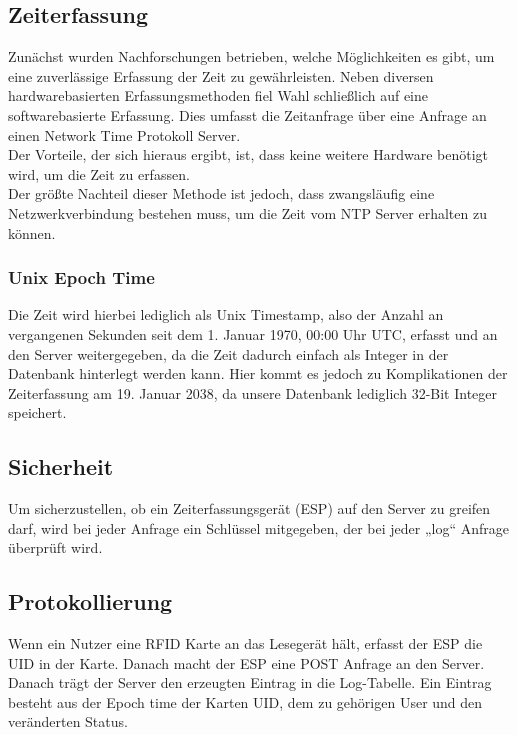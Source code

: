 \documentclass[../main.tex]{subfiles}
\begin{document}
\subsection{Zeiterfassung} \label{ZeitwerfassungEntwicklung}
Zunächst wurden Nachforschungen betrieben, welche Möglichkeiten es gibt, um eine zuverlässige Erfassung der Zeit zu gewährleisten. Neben diversen hardwarebasierten Erfassungsmethoden fiel Wahl schließlich auf eine softwarebasierte Erfassung. Dies umfasst die Zeitanfrage über eine Anfrage an einen Network Time Protokoll Server.\\
Der Vorteile, der sich hieraus ergibt, ist, dass keine weitere Hardware benötigt wird, um die Zeit zu erfassen.\\ 
Der größte Nachteil dieser Methode ist jedoch, dass zwangsläufig eine Netzwerkverbindung bestehen muss, um die Zeit vom NTP Server erhalten zu können.
\subsubsection{Unix Epoch Time} 
Die Zeit wird hierbei lediglich als Unix Timestamp, also der Anzahl an vergangenen Sekunden seit dem 1. Januar 1970, 00:00 Uhr UTC, erfasst und an den Server weitergegeben, da die Zeit dadurch einfach als Integer in der Datenbank hinterlegt werden kann. Hier kommt es jedoch zu Komplikationen der Zeiterfassung am 19. Januar 2038, da unsere Datenbank lediglich 32-Bit Integer speichert.


\subsection{Sicherheit}

Um sicherzustellen, ob ein Zeiterfassungsgerät (ESP) auf den Server zu greifen darf, wird bei jeder Anfrage ein Schlüssel mitgegeben, der bei jeder „log“ Anfrage überprüft wird.

\subsection{Protokollierung}

Wenn ein Nutzer eine RFID Karte an das Lesegerät hält, erfasst der ESP die UID in der Karte. Danach macht der ESP eine POST Anfrage an den Server. Danach trägt der Server den erzeugten Eintrag in die Log-Tabelle. Ein Eintrag besteht aus der Epoch time der Karten UID, dem zu gehörigen User und den veränderten Status.
\end{document}
